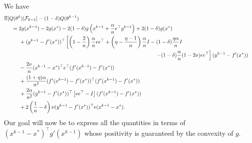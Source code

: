 \documentclass{article}
\newcommand{\idm}{I}
\def\E{_{\scriptscriptstyle E}}
\def \E{{\mathbb E}}
\def \E{{\mathbb E}}
\begin{document}
We have
\begin{align*}
& \E [ Q(\theta^k) | \mathcal{F}_{k-1} ] - ( 1 - \delta) Q(\theta^{k-1}) \\
&\hspace*{.5cm} = 2 g (x^{k-1}) - 2 g(x^\ast) - 2 ( 1 - \delta) g \left(x^{k-1} + \frac{\alpha}{n} e^\top y^{k-1} \right)
+ 2 ( 1 - \delta) g( x^\ast) \\
&\hspace*{1cm} + (y^{k-1} - f'(x^\ast))^\top
\left[
\left(1-\frac{2}{n}\right) \frac{\alpha}{n} ee^\top + \left(\eta - \frac{\eta-1}{n}\right) \frac{\alpha}{n} \idm
- (1-\delta) \frac{\eta \alpha}{n} \idm \right. \\
& \hspace*{10cm} \left. - (1-\delta) \frac{\alpha}{n} (1 - 2 \nu )ee^\top
\right] (y^{k-1} - f'(x^\ast)) \\
&\hspace*{1cm} -\frac{2 \nu}{n} (x^{k-1} -x^\ast)^\top e ^\top ( f'(x^{k-1}) - f'(x^\ast)) \\
& \hspace*{1cm} + \frac{(1+\eta) \alpha}{n^2} ( f'(x^{k-1}) - f'(x^\ast))^\top  ( f'(x^{k-1}) - f'(x^\ast)) \\
&\hspace*{1cm} + \frac{2\alpha}{n^2} (y^{k-1} - f'(x^\ast))^\top \left[ ee^\top - \idm
\right] ( f'(x^{k-1}) - f'(x^\ast)) \\
&\hspace*{1cm} + 2 \left(\frac{1}{n}-\delta\right) \nu (y^{k-1} - f'(x^\ast))^\top e (x^{k-1} -x^\ast).
\end{align*}
Our goal will now be to express all the quantities in terms of $(x^{k-1} -x^\ast)^\top g'(x^{k-1})$ whose positivity is guaranteed by the convexity of $g$.
\end{document}
